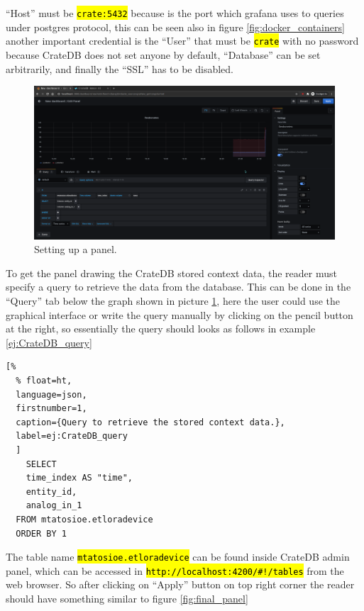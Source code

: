 \documentclass[11pt,a4paper,dvipsnames,twoside]{article}
\newcommand{\cmd}[1] {\hl{\texttt{#1}}}
\begin{document}
\enquote{Host} must be \cmd{crate:5432} because is the port which grafana uses to queries under postgres protocol, this can be seen also in figure \ref{fig:docker_containers} another important credential is the \enquote{User} that must be \cmd{crate} with no password because CrateDB does not set anyone by default, \enquote{Database} can be set arbitrarily, and finally the \enquote{SSL} has to be disabled. 

\begin{figure}[ht]
  \centering
  \includegraphics[width=.9\textwidth]{../pictures/Grafana_panel_setup.png}
  \caption{Setting up a panel.}
  \label{fig:panel_setup}
\end{figure}

To get the panel drawing the CrateDB stored context data, the reader must specify a query to retrieve the data from the database. This can be done in the \enquote{Query} tab below the graph shown in picture \ref{fig:panel_setup}, here the user could use the graphical interface or write the query manually by clicking on the pencil button at the right, so essentially the query should looks as follows in example \ref{ej:CrateDB_query}

\begin{lstlisting}[%
  % float=ht,
  language=json,
  firstnumber=1,
  caption={Query to retrieve the stored context data.},
  label=ej:CrateDB_query
  ]
    SELECT
    time_index AS "time",
    entity_id,
    analog_in_1
  FROM mtatosioe.etloradevice
  ORDER BY 1
\end{lstlisting}

The table name \cmd{mtatosioe.etloradevice} can be found inside CrateDB admin panel, which can be accessed in \cmd{http://localhost:4200/\#!/tables} from the web browser. So after clicking on \enquote{Apply} button on top right corner the reader should have something similar to figure \ref{fig:final_panel}
\end{document}

